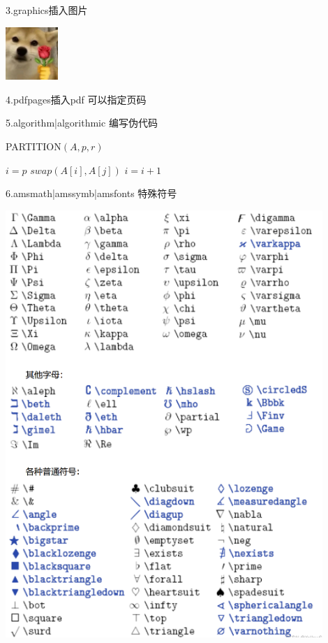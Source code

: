 \documentclass[withoutpreface,bwprint]{cumcmthesis}
\begin{document}
	\noindent 3.graphics插入图片
	
	\includegraphics[height=2cm]{figures/sample.png}
	
	\noindent 4.pdfpages插入pdf 可以指定页码
	
	
	
	\newpage
	
	\noindent 5.algorithm|algorithmic 编写伪代码
	
\begin{algorithm}[htbp!]
	\caption{PARTITION$(A,p,r)$}%
	\begin{algorithmic}[1]%
		\STATE $i=p$
				\STATE $swap(A[i],A[j])$
				\STATE $i=i+1$
			\ENDIF
		\ENDFOR
	\end{algorithmic}
\end{algorithm}


	
	\noindent 6.amsmath|amssymb|amsfonts 特殊符号
	
	\includegraphics[width=12cm]{figures/signal.png}
	
\end{document}
